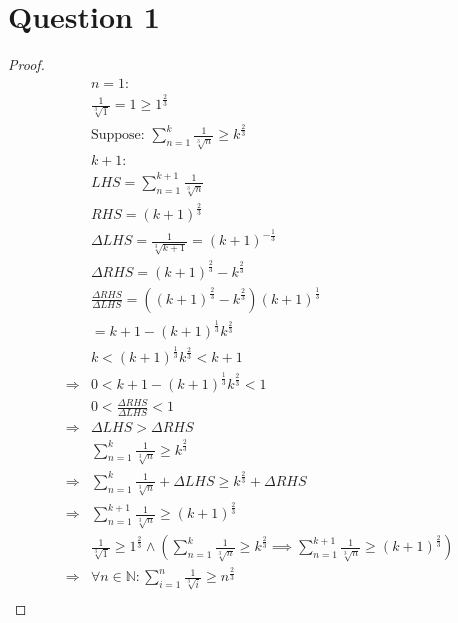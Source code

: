 \documentclass{article}
\begin{document}
\section*{Question 1}

\begin{proof}
    \begin{align*}
        &n=1:\\
        &\frac{1}{\sqrt[3]{1}}=1\geqslant1^{\frac{2}{3}}\\
        &\text{Suppose: }\sum_{n=1}^{k}\frac{1}{\sqrt[3]{n}}\geqslant k^{\frac{2}{3}}\\
        &k+1:\\
        &LHS=\sum_{n=1}^{k+1}\frac{1}{\sqrt[3]{n}}\\
        &RHS=(k+1)^{\frac{2}{3}}\\
        &\Delta LHS=\frac{1}{\sqrt[3]{k+1}}=(k+1)^{-\frac{1}{3}}\\
        &\Delta RHS=(k+1)^{\frac{2}{3}}-k^{\frac{2}{3}}\\
        &\frac{\Delta RHS}{\Delta LHS}=((k+1)^{\frac{2}{3}}-k^{\frac{2}{3}})(k+1)^{\frac{1}{3}}\\
        &=k+1-(k+1)^{\frac{1}{3}}k^{\frac{2}{3}}\\
        &k<(k+1)^{\frac{1}{3}}k^{\frac{2}{3}}<k+1\\
        \Rightarrow&0<k+1-(k+1)^{\frac{1}{3}}k^{\frac{2}{3}}<1\\
        &0<\frac{\Delta RHS}{\Delta LHS}<1\\
        \Rightarrow&\Delta LHS>\Delta RHS\\
        &\sum_{n=1}^{k}\frac{1}{\sqrt[3]{n}}\geqslant k^{\frac{2}{3}}\\
        \Rightarrow&\sum_{n=1}^{k}\frac{1}{\sqrt[3]{n}}+\Delta LHS\geqslant k^{\frac{2}{3}}+\Delta RHS\\
        \Rightarrow&\sum_{n=1}^{k+1}\frac{1}{\sqrt[3]{n}}\geqslant(k+1)^{\frac{2}{3}}\\
        &\frac{1}{\sqrt[3]{1}}\geqslant1^{\frac{2}{3}}\land (\sum_{n=1}^{k}\frac{1}{\sqrt[3]{n}}\geqslant k^{\frac{2}{3}}\implies \sum_{n=1}^{k+1}\frac{1}{\sqrt[3]{n}}\geqslant(k+1)^{\frac{2}{3}})\\
        \Rightarrow&\forall n\in \mathbb{N} :\sum_{i=1}^{n}\frac{1}{\sqrt[3]{i}}\geqslant n^{\frac{2}{3}}\\
    \end{align*}
\end{proof}

\newpage
\end{document}
